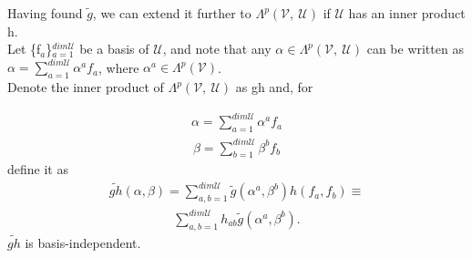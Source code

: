 \documentclass[12pt,a4paper]{article}
\begin{document}
Having found $\widetilde{g}$, we can extend it further to  $\Lambda^{p}(\mathcal{V}, \ \mathcal{U})$ if $\mathcal{U}$ has an inner product h. \\Let \{f$_a$\}$^{dim \mathcal{U}}_{a=1}$ be a basis of $\mathcal{U}$, and note that any $\alpha \in \Lambda^{p}(\mathcal{V},\ \mathcal{U})$ can be written as $\alpha = \sum^{dim \mathcal{U}}_{a =1} \alpha^a f_a$, where $\alpha^a \in \Lambda^{p}(\mathcal{V})$. \\Denote the inner product of $\Lambda^{p}(\mathcal{V},\ \mathcal{U})$ as gh and, for 

\begin{align*}
\alpha = \sum^{dim \mathcal{U}}_{a=1} \alpha^a f_a
\end{align*}
\begin{align*}
\beta = \sum^{dim \mathcal{U}}_{b=1} \beta^b f_b
\end{align*}
define it as 
\begin{align*}
\widetilde{gh} (\alpha, \beta) = \sum^{dim \mathcal{U}}_{a, b =1} \widetilde{g} (\alpha^a, \beta^b) h(f_a, f_b) \equiv
\end{align*}
\begin{align*}
 \sum^{dim \mathcal{U}}_{a,b = 1} h_{ab} \widetilde{g} (\alpha^a, \beta^b).
\end{align*}
$\widetilde{gh}$ is basis-independent.
\end{document}

